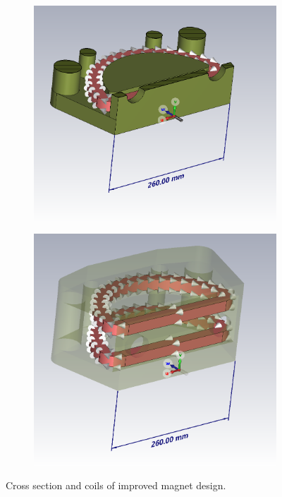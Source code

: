 \documentclass[a4paper,oneside,12pt]{report}
\numberwithin{equation}{chapter}
\begin{document}
\begin{figure}[H]
    \captionsetup[subfigure]{justification=centering}
    \captionsetup{justification=centering}
    \centering
    \begin{subfigure}{.5\textwidth}
      \centering
      \includegraphics[width=.96\linewidth]{./figures/cst/cst_second_magnet_design2.png}
    \end{subfigure}%
    \centering
    \begin{subfigure}{.5\textwidth}
      \centering
      \includegraphics[width=.9\linewidth]{./figures/cst/cst_second_magnet_design3.png}
    \end{subfigure}
    \caption{Cross section and coils of improved magnet design.}
    \label{fig:improved_magnet_design_cross_section}
\end{figure}
\end{document}
